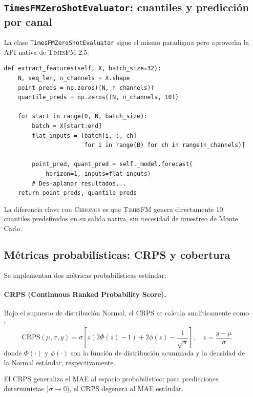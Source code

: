 \documentclass[12pt, a4paper]{article}
\newcommand{\code}[1]{\texttt{#1}}
\newcommand{\chronos}{\textsc{Chronos}}
\newcommand{\timesfm}{\textsc{TimesFM}}
\begin{document}
\subsection{\code{TimesFMZeroShotEvaluator}: cuantiles y predicción por canal}

La clase \code{TimesFMZeroShotEvaluator} sigue el mismo paradigma pero aprovecha la API nativa de \timesfm{} 2.5:

\begin{lstlisting}[caption={Extracción de características con TimesFM (simplificado).}, label={lst:timesfm_extract}]
def extract_features(self, X, batch_size=32):
    N, seq_len, n_channels = X.shape
    point_preds = np.zeros((N, n_channels))
    quantile_preds = np.zeros((N, n_channels, 10))

    for start in range(0, N, batch_size):
        batch = X[start:end]
        flat_inputs = [batch[i, :, ch]
                       for i in range(B) for ch in range(n_channels)]

        point_pred, quant_pred = self._model.forecast(
            horizon=1, inputs=flat_inputs)
        # Des-aplanar resultados...
    return point_preds, quantile_preds
\end{lstlisting}

La diferencia clave con \chronos{} es que \timesfm{} genera directamente 10 cuantiles predefinidos en su salida nativa, sin necesidad de muestreo de Monte Carlo.


\subsection{Métricas probabilísticas: CRPS y cobertura}

Se implementan dos métricas probabilísticas estándar:

\paragraph{CRPS (Continuous Ranked Probability Score).}
Bajo el supuesto de distribución Normal, el CRPS se calcula analíticamente como \cite{gneiting2007scoring}:
\[
\text{CRPS}(\mu, \sigma, y) = \sigma \left[ z (2\Phi(z) - 1) + 2\phi(z) - \frac{1}{\sqrt{\pi}} \right], \quad z = \frac{y - \mu}{\sigma}
\]
donde $\Phi(\cdot)$ y $\phi(\cdot)$ son la función de distribución acumulada y la densidad de la Normal estándar, respectivamente.

El CRPS generaliza el MAE al espacio probabilístico: para predicciones deterministas ($\sigma \to 0$), el CRPS degenera al MAE estándar.
\end{document}
